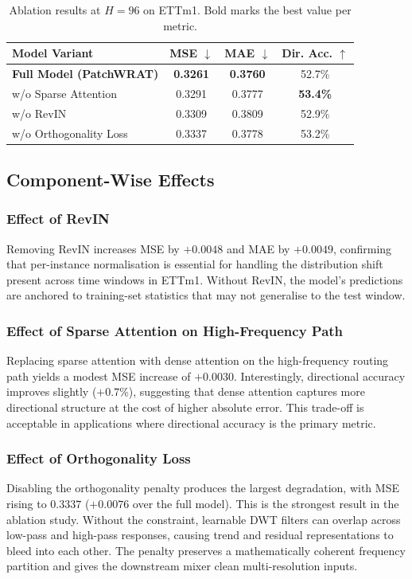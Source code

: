 \documentclass[11pt, letterpaper]{article}
\begin{document}
\begin{table}[H]
\centering
\caption{Ablation results at $H=96$ on ETTm1. Bold marks the best value per metric.}
\label{tab:ablation}
\renewcommand{\arraystretch}{1.5}
\sffamily
\begin{tabular}{@{}p{6cm}ccc@{}}
\toprule
\textbf{Model Variant} & \textbf{MSE} $\downarrow$ & \textbf{MAE} $\downarrow$ & \textbf{Dir. Acc.} $\uparrow$ \\
\midrule
\textbf{Full Model (PatchWRAT)} & \textbf{0.3261} & \textbf{0.3760} & 52.7\% \\
w/o Sparse Attention            & 0.3291 & 0.3777 & \textbf{53.4\%} \\
w/o RevIN                       & 0.3309 & 0.3809 & 52.9\% \\
w/o Orthogonality Loss          & 0.3337 & 0.3778 & 53.2\% \\
\bottomrule
\end{tabular}
\end{table}

\subsection{Component-Wise Effects}

\subsubsection{Effect of RevIN}
Removing RevIN increases MSE by $+0.0048$ and MAE by $+0.0049$, confirming that per-instance normalisation is essential for handling the distribution shift present across time windows in ETTm1. Without RevIN, the model's predictions are anchored to training-set statistics that may not generalise to the test window.

\subsubsection{Effect of Sparse Attention on High-Frequency Path}
Replacing sparse attention with dense attention on the high-frequency routing path yields a modest MSE increase of $+0.0030$. Interestingly, directional accuracy improves slightly ($+0.7\%$), suggesting that dense attention captures more directional structure at the cost of higher absolute error. This trade-off is acceptable in applications where directional accuracy is the primary metric.

\subsubsection{Effect of Orthogonality Loss}
Disabling the orthogonality penalty produces the largest degradation, with MSE rising to $0.3337$ ($+0.0076$ over the full model). This is the strongest result in the ablation study. Without the constraint, learnable DWT filters can overlap across low-pass and high-pass responses, causing trend and residual representations to bleed into each other. The penalty preserves a mathematically coherent frequency partition and gives the downstream mixer clean multi-resolution inputs.
\end{document}
